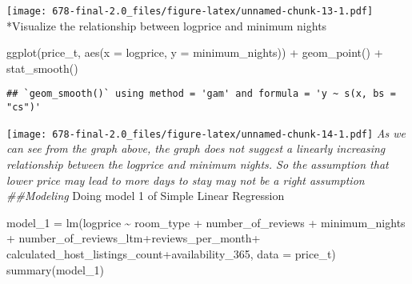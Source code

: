 \documentclass[
]{article}
\newenvironment{Shaded}{\begin{snugshade}}{\end{snugshade}}
\newcommand{\AttributeTok}[1]{\textcolor[rgb]{0.77,0.63,0.00}{#1}}
\newcommand{\FunctionTok}[1]{\textcolor[rgb]{0.00,0.00,0.00}{#1}}
\newcommand{\NormalTok}[1]{#1}
\newcommand{\OtherTok}[1]{\textcolor[rgb]{0.56,0.35,0.01}{#1}}
\newcommand{\SpecialCharTok}[1]{\textcolor[rgb]{0.00,0.00,0.00}{#1}}
\begin{document}
\texttt{[image: 678-final-2.0\_files/figure-latex/unnamed-chunk-13-1.pdf]}
*Visualize the relationship between logprice and minimum nights

\begin{Shaded}
\begin{Highlighting}[]
\FunctionTok{ggplot}\NormalTok{(price\_t, }\FunctionTok{aes}\NormalTok{(}\AttributeTok{x =}\NormalTok{ logprice, }\AttributeTok{y =}\NormalTok{ minimum\_nights)) }\SpecialCharTok{+}
  \FunctionTok{geom\_point}\NormalTok{() }\SpecialCharTok{+}
  \FunctionTok{stat\_smooth}\NormalTok{()}
\end{Highlighting}
\end{Shaded}

\begin{verbatim}
## `geom_smooth()` using method = 'gam' and formula = 'y ~ s(x, bs = "cs")'
\end{verbatim}

\texttt{[image: 678-final-2.0\_files/figure-latex/unnamed-chunk-14-1.pdf]}
\emph{As we can see from the graph above, the graph does not suggest a
linearly increasing relationship between the logprice and minimum
nights. So the assumption that lower price may lead to more days to stay
may not be a right assumption \#\#Modeling }Doing model 1 of Simple
Linear Regression

\begin{Shaded}
\begin{Highlighting}[]
\NormalTok{model\_1 }\OtherTok{=} \FunctionTok{lm}\NormalTok{(logprice }\SpecialCharTok{\textasciitilde{}}\NormalTok{ room\_type }\SpecialCharTok{+}\NormalTok{ number\_of\_reviews }\SpecialCharTok{+}\NormalTok{ minimum\_nights }\SpecialCharTok{+}\NormalTok{ number\_of\_reviews\_ltm}\SpecialCharTok{+}\NormalTok{reviews\_per\_month}\SpecialCharTok{+}\NormalTok{ calculated\_host\_listings\_count}\SpecialCharTok{+}\NormalTok{availability\_365, }\AttributeTok{data =}\NormalTok{ price\_t) }
\FunctionTok{summary}\NormalTok{(model\_1)}
\end{Highlighting}
\end{Shaded}
\end{document}
